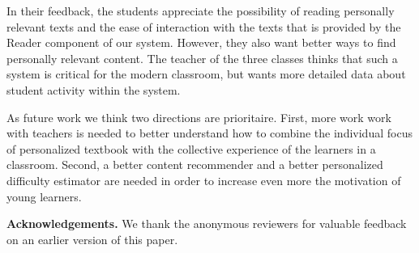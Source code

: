 In their feedback, the students appreciate the possibility of reading personally relevant texts and the ease of interaction with the texts that is provided by the Reader component of our system. However, they also want better ways to find personally relevant content. The teacher of the three classes thinks that such a system is critical for the modern classroom, but wants more detailed data about student activity within the system.

As future work we think two directions are prioritaire. First, more work work with teachers is needed to better understand how to combine the individual focus of personalized textbook with the collective experience of the learners in a classroom.
Second, a better content recommender and a better personalized difficulty estimator are needed in order to increase even more the motivation of young learners.



{\footnotesize
	{\bf Acknowledgements.} We thank the anonymous reviewers for valuable feedback on an earlier version of this paper. 
}